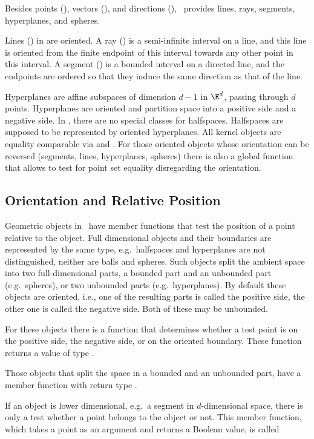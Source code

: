 Besides points (), vectors (), and
directions (), \cgal\ provides lines, rays,
segments, hyperplanes, and spheres.

Lines () in {\cgal} are oriented.  A ray
() is a semi-infinite interval on a line, and this line
is oriented from the finite endpoint of this interval towards any
other point in this interval. A segment () is a
bounded interval on a directed line, and the endpoints are ordered so
that they induce the same direction as that of the line.

Hyperplanes are affine subspaces of dimension $d-1$ in $\E^d$, passing
through $d$ points.  Hyperplanes are oriented and partition space into
a positive side and a negative side.  In \cgal, there are no special
classes for halfspaces.  Halfspaces are supposed to be represented by
oriented hyperplanes. All kernel objects are equality comparable via
 and . For those oriented objects
whose orientation can be reversed (segments, lines, hyperplanes,
spheres) there is also a global function  that
allows to test for point set equality disregarding the orientation.


\subsection{Orientation and Relative Position}

Geometric objects in \cgal\ have member functions that test the
position of a point relative to the object.  Full dimensional objects
and their boundaries are represented by the same type, e.g.\ 
halfspaces and hyperplanes are not distinguished, neither are balls
and spheres. Such objects split the ambient space into two
full-dimensional parts, a bounded part and an unbounded part (e.g.\ 
spheres), or two unbounded parts (e.g.\ hyperplanes). By default these
objects are oriented, i.e., one of the resulting parts is called the
positive side, the other one is called the negative side. Both of
these may be unbounded.

For these objects there is a function  that
determines whether a test point is on the positive side, the negative
side, or on the oriented boundary. These function returns a value of
type \ccc{Oriented_side}.

Those objects that split the space in a bounded and an unbounded part,
have a member function  with return type
\ccc{Bounded_side}.

If an object is lower dimensional, e.g.\ a segment in $d$-dimensional
space, there is only a test whether a point belongs to the object or
not. This member function, which takes a point as an argument and
returns a Boolean value, is called \ccStyle{has_on()}

